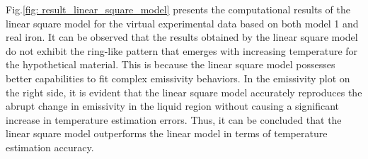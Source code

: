 Fig.\ref{fig: result_linear_square_model} presents the computational results of the 
linear square model for the virtual experimental data based on both model 1 and 
real iron. It can be observed that the results obtained by the linear square 
model do not exhibit the ring-like pattern that emerges with increasing temperature 
for the hypothetical material. This is because the linear square model possesses 
better capabilities to fit complex emissivity behaviors. In the emissivity plot 
on the right side, it is evident that the linear square model accurately 
reproduces the abrupt change in emissivity in the liquid region without 
causing a significant increase in temperature estimation errors. Thus, it can be 
concluded that the linear square model outperforms the linear model in terms 
of temperature estimation accuracy.


